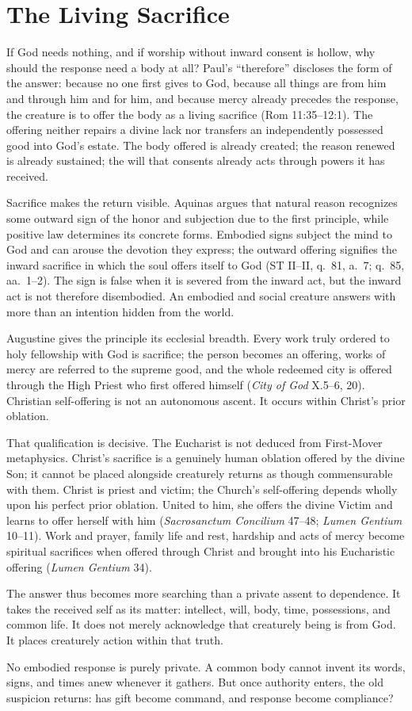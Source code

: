 \section{The Living Sacrifice}

If God needs nothing, and if worship without inward consent is hollow, why should the response need a body at all? Paul's ``therefore'' discloses the form of the answer: because no one first gives to God, because all things are from him and through him and for him, and because mercy already precedes the response, the creature is to offer the body as a living sacrifice (Rom 11:35--12:1). The offering neither repairs a divine lack nor transfers an independently possessed good into God's estate. The body offered is already created; the reason renewed is already sustained; the will that consents already acts through powers it has received.

Sacrifice makes the return visible. Aquinas argues that natural reason recognizes some outward sign of the honor and subjection due to the first principle, while positive law determines its concrete forms. Embodied signs subject the mind to God and can arouse the devotion they express; the outward offering signifies the inward sacrifice in which the soul offers itself to God (ST II--II, q.~81, a.~7; q.~85, aa.~1--2). The sign is false when it is severed from the inward act, but the inward act is not therefore disembodied. An embodied and social creature answers with more than an intention hidden from the world.

Augustine gives the principle its ecclesial breadth. Every work truly ordered to holy fellowship with God is sacrifice; the person becomes an offering, works of mercy are referred to the supreme good, and the whole redeemed city is offered through the High Priest who first offered himself (\emph{City of God} X.5--6, 20). Christian self-offering is not an autonomous ascent. It occurs within Christ's prior oblation.

That qualification is decisive. The Eucharist is not deduced from First-Mover metaphysics. Christ's sacrifice is a genuinely human oblation offered by the divine Son; it cannot be placed alongside creaturely returns as though commensurable with them. Christ is priest and victim; the Church's self-offering depends wholly upon his perfect prior oblation. United to him, she offers the divine Victim and learns to offer herself with him (\emph{Sacrosanctum Concilium} 47--48; \emph{Lumen Gentium} 10--11). Work and prayer, family life and rest, hardship and acts of mercy become spiritual sacrifices when offered through Christ and brought into his Eucharistic offering (\emph{Lumen Gentium} 34).

The answer thus becomes more searching than a private assent to dependence. It takes the received self as its matter: intellect, will, body, time, possessions, and common life. It does not merely acknowledge that creaturely being is from God. It places creaturely action within that truth.

No embodied response is purely private. A common body cannot invent its words, signs, and times anew whenever it gathers. But once authority enters, the old suspicion returns: has gift become command, and response become compliance?
